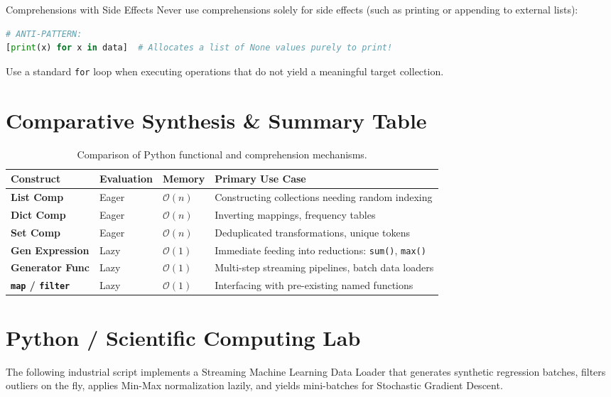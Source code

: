 \begin{trapbox}{Comprehensions with Side Effects}
Never use comprehensions solely for side effects (such as printing or appending to external lists):
\begin{lstlisting}[language=Python]
# ANTI-PATTERN:
[print(x) for x in data]  # Allocates a list of None values purely to print!
\end{lstlisting}
Use a standard \texttt{for} loop when executing operations that do not yield a meaningful target collection.
\end{trapbox}

\section{Comparative Synthesis \& Summary Table}

\begin{table}[htbp]
\centering
\small
\begin{tabular}{p{2.6cm} p{2.2cm} p{2.4cm} p{4.6cm}}
\hline
\textbf{Construct} & \textbf{Evaluation} & \textbf{Memory} & \textbf{Primary Use Case} \\
\hline
\textbf{List Comp} & Eager & $\mathcal{O}(n)$ & Constructing collections needing random indexing \\
\textbf{Dict Comp} & Eager & $\mathcal{O}(n)$ & Inverting mappings, frequency tables \\
\textbf{Set Comp} & Eager & $\mathcal{O}(n)$ & Deduplicated transformations, unique tokens \\
\textbf{Gen Expression} & Lazy & $\mathcal{O}(1)$ & Immediate feeding into reductions: \texttt{sum()}, \texttt{max()} \\
\textbf{Generator Func} & Lazy & $\mathcal{O}(1)$ & Multi-step streaming pipelines, batch data loaders \\
\textbf{\texttt{map} / \texttt{filter}} & Lazy & $\mathcal{O}(1)$ & Interfacing with pre-existing named functions \\
\hline
\end{tabular}
\caption{Comparison of Python functional and comprehension mechanisms.}
\label{tab:comprehension_taxonomy}
\end{table}

\section{Python / Scientific Computing Lab}

The following industrial script implements a Streaming Machine Learning Data Loader that generates synthetic regression batches, filters outliers on the fly, applies Min-Max normalization lazily, and yields mini-batches for Stochastic Gradient Descent.

